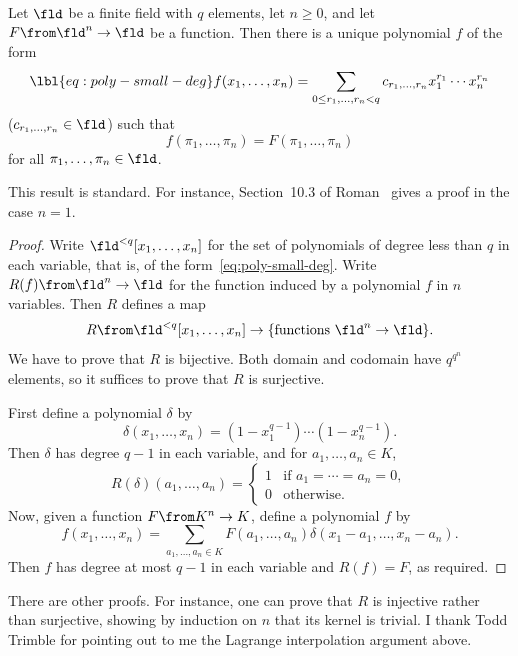 \begin{lemmafff}
Let $\fld$ be a finite field with $q$ elements, let $n \geq 0$, and let $F
\from \fld^n \to \fld$ be a function.  Then there is a unique polynomial
$f$ of the form
% 
\begin{equation}
\lbl{eq:poly-small-deg}
f(x_1, \ldots, x_n)
=
\sum_{0 \leq r_1, \ldots, r_n < q} c_{r_1, \ldots, r_n} 
x_1^{r_1} \cdots x_n^{r_n}
\end{equation}
% 
($c_{r_1, \ldots, r_n} \in \fld$) such that
\[
f(\pi_1, \ldots, \pi_n) = F(\pi_1, \ldots, \pi_n)
\]
% 
for all $\pi_1, \ldots, \pi_n \in \fld$.
\end{lemmafff}

This result is standard.  For instance, Section~10.3 of Roman~\cite{Roma}
gives a proof in the case $n = 1$.

\begin{proof}
Write $\fld^{< q}[x_1, \ldots, x_n]$ for the set of polynomials of degree
less than $q$ in each variable, that is, of the
form~\eqref{eq:poly-small-deg}.  Write $R(f) \from \fld^n \to \fld$ for the
function induced by a polynomial $f$ in $n$ variables.  Then $R$ defines a
map
\[
R \from \fld^{< q}[x_1, \ldots, x_n] \to 
\{\text{functions } \fld^n \to \fld\}.
\]
We have to prove that $R$ is bijective.
% 
Both domain and codomain have $q^{q^n}$ elements, so it suffices to prove
that $R$ is surjective.

First define a polynomial $\delta$ by 
\[
\delta(x_1, \ldots, x_n) = (1 - x_1^{q - 1}) \cdots (1 - x_n^{q - 1}).
\]
Then $\delta$ has degree $q - 1$ in each variable, and for $a_1, \ldots,
a_n \in K$,
\[
R(\delta)(a_1, \ldots, a_n) 
=
\begin{cases}
1       &\text{if } a_1 = \cdots = a_n = 0,     \\
0       &\text{otherwise}.
\end{cases}
\]
Now, given a function $F \from K^n \to K$, define a polynomial $f$ by
\[
f(x_1, \ldots, x_n)
=
\sum_{a_1, \ldots, a_n \in K} 
F(a_1, \ldots, a_n) \delta(x_1 - a_1, \ldots, x_n - a_n).
\]
Then $f$ has degree at most $q - 1$ in each variable and $R(f) = F$, as
required.
\end{proof}

There are other proofs.  For instance, one can prove that $R$ is injective
rather than surjective, showing by induction on $n$ that its kernel is
trivial.  I thank Todd Trimble%
%
% 
for pointing out to me the Lagrange interpolation argument above.


